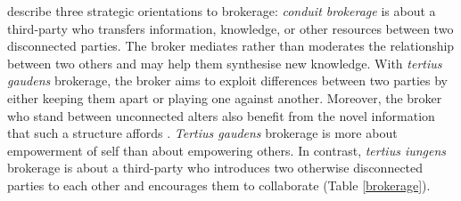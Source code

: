 \citet{obstfeld2014brokerage} describe three strategic orientations to brokerage: \emph{conduit brokerage} is about a third-party who transfers information, knowledge, or other resources between two disconnected parties. The broker mediates rather than moderates the relationship between two others and may help them synthesise new knowledge. With \emph{tertius gaudens} brokerage, the broker aims to exploit differences between two parties by either keeping them apart or playing one against another. Moreover, the broker who stand between unconnected alters also benefit from the novel information that such a structure affords \citep{burt1992structural}. \emph{Tertius gaudens} brokerage is more about empowerment of self than about empowering others. In contrast, \emph{tertius iungens} brokerage is about a third-party who introduces two otherwise disconnected parties to each other and encourages them to collaborate (Table \ref{brokerage}). \medskip 


